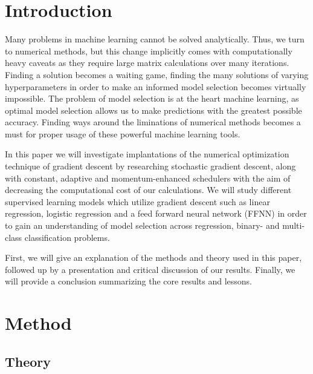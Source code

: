 \documentclass[onecolumn,10pt,cleanfoot]{asme2ej}
\begin{document}
\section{Introduction}
Many problems in machine learning cannot be solved analytically. Thus, we turn to numerical methods, but this change implicitly comes with computationally heavy caveats as they require large matrix calculations over many iterations. Finding a solution becomes a waiting game, finding the many solutions of varying hyperparameters in order to make an informed model selection becomes virtually impossible. The problem of model selection is at the heart machine learning, as optimal model selection allows us to make predictions with the greatest possible accuracy. Finding ways around the liminations of numerical methods becomes a must for proper usage of these powerful machine learning tools.

In this paper we will investigate implantations of the numerical optimization technique of gradient descent by researching stochastic gradient descent, along with constant, adaptive and momentum-enhanced schedulers with the aim of decreasing the computational cost of our calculations. We will study different supervised learning models which utilize gradient descent such as linear regression, logistic regression and a feed forward neural network (FFNN) in order to gain an understanding of model selection across regression, binary- and multi-class classification problems.

First, we will give an explanation of the methods and theory used in this paper, followed up by a presentation and critical discussion of our results. Finally, we will provide a conclusion summarizing the core results and lessons.






\section{Method}

\subsection{Theory}
\end{document}
